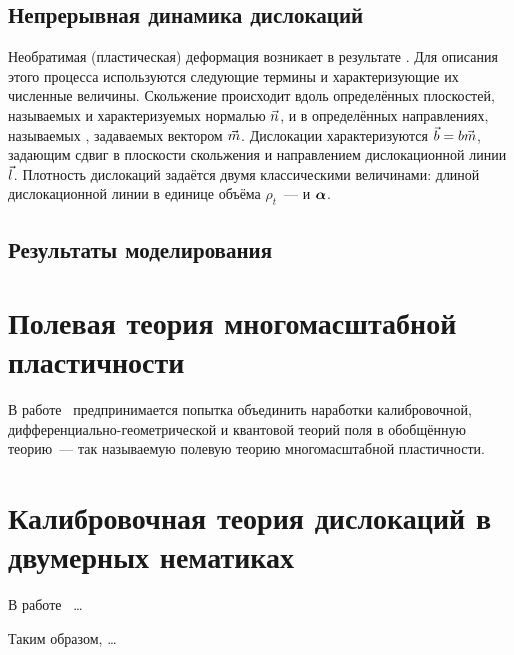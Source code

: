 \documentclass[a4paper, 14pt, titlepage]{extarticle}
\begin{document}
  \subsection{Непрерывная динамика дислокаций} %

  Необратимая (пластическая) деформация возникает в результате . Для описания
  этого процесса используются следующие термины и характеризующие их численные величины. Скольжение
  происходит вдоль определённых плоскостей, называемых  и
  характеризуемых нормалью $\vec{n}$, и в определённых направлениях, называемых , задаваемых вектором $\vec{m}$. Дислокации характеризуются 
  $\vec{b} = b \vec{m}$, задающим сдвиг в плоскости скольжения и направлением дислокационной линии $\vec{l}$.
  Плотность дислокаций задаётся двумя классическими величинами: длиной дислокационной линии в
  единице объёма $\rho_t$~---  и  $\bm{\alpha}$. %


  \subsection{Результаты моделирования}

  \section{Полевая теория многомасштабной пластичности}

  В работе~\cite{hasebe-ftmp} предпринимается попытка объединить наработки калибровочной,
  дифференциально-геометрической и квантовой теорий поля в обобщённую теорию~--- так называемую
  полевую теорию многомасштабной пластичности.

  \section{Калибровочная теория дислокаций в двумерных нематиках}

  В работе~\cite{liu-nematic} \dots


  Таким образом, \dots

  \PrintBibliography
\end{document}
